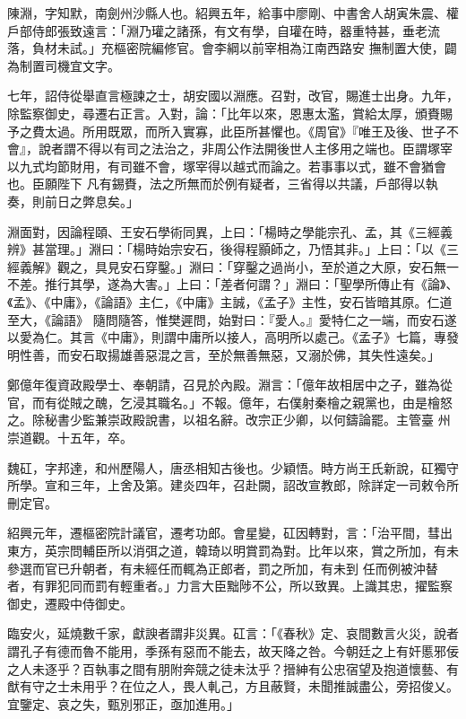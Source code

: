 \begin{pinyinscope}
 陳淵，字知默，南劍州沙縣人也。紹興五年，給事中廖剛、中書舍人胡寅朱震、權戶部侍郎張致遠言：「淵乃瓘之諸孫，有文有學，自瓘在時，器重特甚，垂老流落，負材未試。」充樞密院編修官。會李綱以前宰相為江南西路安
 撫制置大使，闢為制置司機宜文字。



 七年，詔侍從舉直言極諫之士，胡安國以淵應。召對，改官，賜進士出身。九年，除監察御史，尋遷右正言。入對，論：「比年以來，恩惠太濫，賞給太厚，頒賚賜予之費太過。所用既眾，而所入實寡，此臣所甚懼也。《周官》『唯王及後、世子不會』，說者謂不得以有司之法治之，非周公作法開後世人主侈用之端也。臣謂塚宰以九式均節財用，有司雖不會，塚宰得以越式而論之。若事事以式，雖不會猶會也。臣願陛下
 凡有錫賚，法之所無而於例有疑者，三省得以共議，戶部得以執奏，則前日之弊息矣。」



 淵面對，因論程頤、王安石學術同異，上曰：「楊時之學能宗孔、孟，其《三經義辨》甚當理。」淵曰：「楊時始宗安石，後得程顥師之，乃悟其非。」上曰：「以《三經義解》觀之，具見安石穿鑿。」淵曰：「穿鑿之過尚小，至於道之大原，安石無一不差。推行其學，遂為大害。」上曰：「差者何謂？」淵曰：「聖學所傳止有《論》、《孟》、《中庸》，《論語》主仁，《中庸》主誠，《孟子》主性，安石皆暗其原。仁道至大，《論語》
 隨問隨答，惟樊遲問，始對曰：『愛人。』愛特仁之一端，而安石遂以愛為仁。其言《中庸》，則謂中庸所以接人，高明所以處己。《孟子》七篇，專發明性善，而安石取揚雄善惡混之言，至於無善無惡，又溺於佛，其失性遠矣。」



 鄭億年復資政殿學士、奉朝請，召見於內殿。淵言：「億年故相居中之子，雖為從官，而有從賊之醜，乞浸其職名。」不報。億年，右僕射秦檜之親黨也，由是檜怒之。除秘書少監兼崇政殿說書，以祖名辭。改宗正少卿，以何鑄論罷。主管臺
 州崇道觀。十五年，卒。



 魏矼，字邦達，和州歷陽人，唐丞相知古後也。少穎悟。時方尚王氏新說，矼獨守所學。宣和三年，上舍及第。建炎四年，召赴闕，詔改宣教郎，除詳定一司敕令所刪定官。



 紹興元年，遷樞密院計議官，遷考功郎。會星變，矼因轉對，言：「治平間，彗出東方，英宗問輔臣所以消弭之道，韓琦以明賞罰為對。比年以來，賞之所加，有未參選而官已升朝者，有未經任而輒為正郎者，罰之所加，有未到
 任而例被沖替者，有罪犯同而罰有輕重者。」力言大臣黜陟不公，所以致異。上識其忠，擢監察御史，遷殿中侍御史。



 臨安火，延燒數千家，獻諛者謂非災異。矼言：「《春秋》定、哀間數言火災，說者謂孔子有德而魯不能用，季孫有惡而不能去，故天降之咎。今朝廷之上有奸慝邪佞之人未逐乎？百執事之間有朋附奔競之徒未汰乎？搢紳有公忠宿望及抱道懷藝、有猷有守之士未用乎？在位之人，畏人軋己，方且蔽賢，未聞推誠盡公，旁招俊乂。
 宜鑒定、哀之失，甄別邪正，亟加進用。」




\end{pinyinscope}
